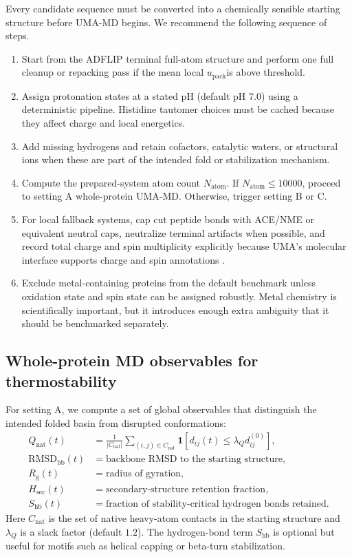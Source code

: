\documentclass[11pt]{article}
\newcommand{\packunc}{\ensuremath{u_{\mathrm{pack}}}}
\begin{document}
Every candidate sequence must be converted into a chemically sensible starting structure before UMA-MD begins. We recommend the following sequence of steps.
\begin{enumerate}[leftmargin=1.5em]
    \item Start from the ADFLIP terminal full-atom structure and perform one full cleanup or repacking pass if the mean local \packunc is above threshold.
    \item Assign protonation states at a stated pH (default pH $7.0$) using a deterministic pipeline. Histidine tautomer choices must be cached because they affect charge and local energetics.
    \item Add missing hydrogens and retain cofactors, catalytic waters, or structural ions when these are part of the intended fold or stabilization mechanism.
    \item Compute the prepared-system atom count $N_{\mathrm{atom}}$. If $N_{\mathrm{atom}}\leq 10000$, proceed to setting A whole-protein UMA-MD. Otherwise, trigger setting B or C.
    \item For local fallback systems, cap cut peptide bonds with ACE/NME or equivalent neutral caps, neutralize terminal artifacts when possible, and record total charge and spin multiplicity explicitly because UMA's molecular interface supports charge and spin annotations \citep{fairchem2025github}.
    \item Exclude metal-containing proteins from the default benchmark unless oxidation state and spin state can be assigned robustly. Metal chemistry is scientifically important, but it introduces enough extra ambiguity that it should be benchmarked separately.
\end{enumerate}

\subsection{Whole-protein MD observables for thermostability}

For setting A, we compute a set of global observables that distinguish the intended folded basin from disrupted conformations:
\begin{align}
    Q_{\mathrm{nat}}(t) &= \frac{1}{|C_{\mathrm{nat}}|}\sum_{(i,j)\in C_{\mathrm{nat}}}\mathbf{1}\!\left[d_{ij}(t)\leq \lambda_Q d_{ij}^{(0)}\right],\\
    \mathrm{RMSD}_{\mathrm{bb}}(t) &= \text{backbone RMSD to the starting structure},\\
    R_{\mathrm g}(t) &= \text{radius of gyration},\\
    H_{\mathrm{sec}}(t) &= \text{secondary-structure retention fraction},\\
    S_{\mathrm{hb}}(t) &= \text{fraction of stability-critical hydrogen bonds retained}.
\end{align}
Here $C_{\mathrm{nat}}$ is the set of native heavy-atom contacts in the starting structure and $\lambda_Q$ is a slack factor (default $1.2$). The hydrogen-bond term $S_{\mathrm{hb}}$ is optional but useful for motifs such as helical capping or beta-turn stabilization.
\end{document}
